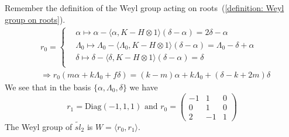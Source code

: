 \begin{itemize}
\begin{center}
\end{center}
Remember the definition of 
the Weyl group acting on roots~(\ref{definition: Weyl group on roots}). 
\begin{equation}
    \begin{split}
        &r_0=\left\{\begin{aligned}
        &\alpha\mapsto \alpha-\langle\alpha,K-H\otimes1\rangle(\delta-\alpha) = 2\delta-\alpha\\
        &\Lambda_0\mapsto \Lambda_0-\langle\Lambda_0,K-H\otimes1\rangle(\delta-\alpha)=\Lambda_0-\delta+\alpha\\
        &\delta\mapsto \delta - \langle\delta,K-H\otimes1\rangle(\delta-\alpha)=\delta\\
    \end{aligned}\right.\\
    &\Rightarrow r_0(m\alpha+k\Lambda_0+f\delta)=(k-m)\alpha+k\Lambda_0+(\delta-k+2m)\delta
    \end{split}
\end{equation}
We see that in the basis $\{\alpha,\Lambda_0,\delta\}$ we have 
\begin{equation}
    r_1 = \text{Diag}(-1,1,1)\text{ and } 
    r_0 = \begin{pmatrix}
        -1&1&0\\0&1&0\\2&-1&1
    \end{pmatrix} 
\end{equation}
The Weyl group of $\widetilde{sl}_2$ is $W=\langle r_0,r_1\rangle$.\par 


\end{itemize}
